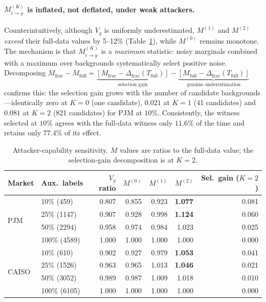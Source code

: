 \documentclass[preprint,12pt]{elsarticle}
\newcommand{\Vy}{V_{y}}
\newcommand{\Mik}{M^{(K)}_{i \to y}}
\begin{document}
\paragraph{$\Mik$ is inflated, not deflated, under weak attackers.}
Counterintuitively, although $\Vy$ is uniformly underestimated, $M^{(1)}$ and $M^{(2)}$
\emph{exceed} their full-data values by 5--12\% (Table~\ref{tab:naux}), while $M^{(0)}$
remains monotone. The mechanism is that $\Mik$ is a \emph{maximum} statistic: noisy marginals
combined with a maximum over backgrounds systematically select positive noise. Decomposing
$M_{\mathrm{frac}}-M_{\mathrm{full}} = \underbrace{[M_{\mathrm{frac}}-\Delta_{\mathrm{frac}}
(T_{\mathrm{full}})]}_{\text{selection gain}} - \underbrace{[M_{\mathrm{full}}-
\Delta_{\mathrm{frac}}(T_{\mathrm{full}})]}_{\text{genuine underestimation}}$ confirms this:
the selection gain grows with the number of candidate backgrounds---identically zero at
$K{=}0$ (one candidate), $0.021$ at $K{=}1$ (41 candidates) and $0.081$ at $K{=}2$ (821
candidates) for PJM at $10\%$. Consistently, the witness selected at $10\%$ agrees with the
full-data witness only $11.6\%$ of the time and retains only $77.4\%$ of its effect.

\begin{table}[t]
\centering
\caption{Attacker-capability sensitivity. $M$ values are ratios to the full-data value;
the selection-gain decomposition is at $K=2$.}
\label{tab:naux}
\small
\begin{tabular}{llrrrrr}
\toprule
Market & Aux.\ labels & $\Vy$ ratio & $M^{(0)}$ & $M^{(1)}$ & $M^{(2)}$ & Sel.\ gain ($K{=}2$) \\
\midrule
\multirow{4}{*}{PJM}
 & 10\% (459)   & 0.807 & 0.855 & 0.923 & \textbf{1.077} & 0.081 \\
 & 25\% (1147)  & 0.907 & 0.928 & 0.998 & \textbf{1.124} & 0.060 \\
 & 50\% (2294)  & 0.958 & 0.974 & 0.984 & 1.023 & 0.025 \\
 & 100\% (4589) & 1.000 & 1.000 & 1.000 & 1.000 & 0.000 \\
\midrule
\multirow{4}{*}{CAISO}
 & 10\% (610)   & 0.902 & 0.927 & 0.979 & \textbf{1.053} & 0.041 \\
 & 25\% (1526)  & 0.963 & 0.965 & 1.013 & \textbf{1.046} & 0.021 \\
 & 50\% (3052)  & 0.989 & 0.987 & 1.009 & 1.018 & 0.010 \\
 & 100\% (6105) & 1.000 & 1.000 & 1.000 & 1.000 & 0.000 \\
\bottomrule
\end{tabular}
\end{table}
\end{document}
